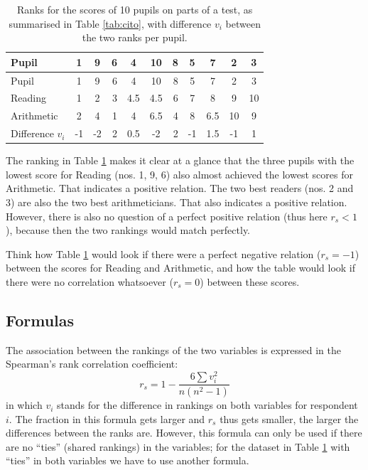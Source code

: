\documentclass[
]{book}
\begin{document}
\begin{longtable}[]{@{}lccrccrcccc@{}}
\caption{\label{tab:cito-ranks} Ranks for the scores of 10 pupils on parts of a test, as summarised in
Table \ref{tab:cito}, with difference \(v_i\) between the two ranks per pupil.}\tabularnewline
\toprule\noalign{}
Pupil & 1 & 9 & 6 & 4 & 10 & 8 & 5 & 7 & 2 & 3 \\
\midrule\noalign{}
\endfirsthead
\toprule\noalign{}
Pupil & 1 & 9 & 6 & 4 & 10 & 8 & 5 & 7 & 2 & 3 \\
\midrule\noalign{}
\endhead
\bottomrule\noalign{}
\endlastfoot
Reading & 1 & 2 & 3 & 4.5 & 4.5 & 6 & 7 & 8 & 9 & 10 \\
Arithmetic & 2 & 4 & 1 & 4 & 6.5 & 4 & 8 & 6.5 & 10 & 9 \\
Difference \(v_i\) & -1 & -2 & 2 & 0.5 & -2 & 2 & -1 & 1.5 & -1 & 1 \\
\end{longtable}

The ranking in Table \ref{tab:cito-ranks} makes it clear at a glance that
the three pupils with the lowest score for Reading (nos. 1, 9, 6) also almost achieved
the lowest scores for Arithmetic. That indicates a positive
relation. The two best readers (nos. 2 and 3) are also the two best
arithmeticians. That also indicates a positive relation. However, there is
also no question of a perfect positive relation (thus here \(r_s<1\)), because
then the two rankings would match perfectly.

Think how Table \ref{tab:cito-ranks} would look if there were a perfect
negative relation (\(r_s=-1\)) between the scores for Reading and
Arithmetic, and how the table would look if there were no correlation whatsoever
(\(r_s=0\)) between these scores.

\subsection{Formulas}\label{formulas-4}

The association between the rankings of the two variables is expressed
in the Spearman's rank correlation coefficient:
\begin{equation}
    r_s = 1 - \frac{6 \sum v_i^2}{n(n^2-1)}
  \label{eq:spearman}
\end{equation}
in which \(v_i\) stands for
the difference in rankings on both variables for respondent \(i\). The fraction
in this formula gets larger and \(r_s\) thus gets smaller, the larger the
differences between the ranks are.
However, this formula can only be used if there are no ``ties'' (shared rankings) in the
variables; for the dataset in Table \ref{tab:cito-ranks} with ``ties'' in both variables
we have to use another formula.
\end{document}
